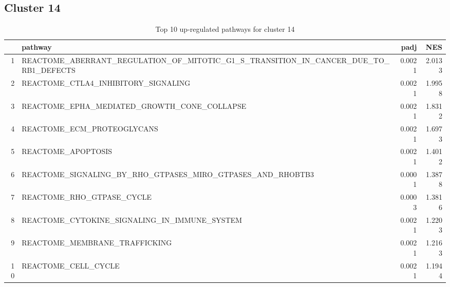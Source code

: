 \documentclass{article}
\begin{document}
\subsection{Cluster 14 }
\begin{table}[H]
\centering
\begin{tabularx}{\textwidth}{rlrr}
  \hline
 & pathway & padj & NES \\ 
  \hline
1 & REACTOME\_ABERRANT\_REGULATION\_OF\_MITOTIC\_G1\_S\_TRANSITION\_IN\_CANCER\_DUE\_TO\_RB1\_DEFECTS & 0.0021 & 2.0133 \\ 
  2 & REACTOME\_CTLA4\_INHIBITORY\_SIGNALING & 0.0021 & 1.9958 \\ 
  3 & REACTOME\_EPHA\_MEDIATED\_GROWTH\_CONE\_COLLAPSE & 0.0021 & 1.8312 \\ 
  4 & REACTOME\_ECM\_PROTEOGLYCANS & 0.0021 & 1.6973 \\ 
  5 & REACTOME\_APOPTOSIS & 0.0021 & 1.4012 \\ 
  6 & REACTOME\_SIGNALING\_BY\_RHO\_GTPASES\_MIRO\_GTPASES\_AND\_RHOBTB3 & 0.0001 & 1.3878 \\ 
  7 & REACTOME\_RHO\_GTPASE\_CYCLE & 0.0003 & 1.3816 \\ 
  8 & REACTOME\_CYTOKINE\_SIGNALING\_IN\_IMMUNE\_SYSTEM & 0.0021 & 1.2203 \\ 
  9 & REACTOME\_MEMBRANE\_TRAFFICKING & 0.0021 & 1.2163 \\ 
  10 & REACTOME\_CELL\_CYCLE & 0.0021 & 1.1944 \\ 
   \hline
\end{tabularx}
\caption{Top 10 up-regulated pathways for cluster 14} 
\label{tab:q3_2_14}
\end{table}
\end{document}
